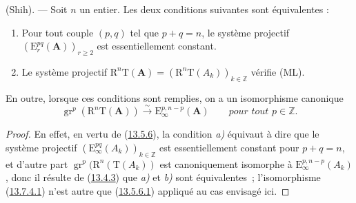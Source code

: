 \begin{proposition}[13.7.4]
\label{0.13.7.4-fr}
(Shih). --- Soit $n$ un entier. Les deux conditions suivantes sont
équivalentes :
\begin{enumerate}
\item[\emph{a)}] Pour tout couple $(p,q)$ tel que $p+q=n$, le
système projectif $(\mathrm E_r^{pq}(\mathbf A))_{r\geq2}$ est
essentiellement constant.
\item[\emph{b)}] Le système projectif
$\mathrm R^n\mathrm T(\mathbf A)=
(\mathrm R^n\mathrm T(A_k))_{k\in\mathbb Z}$ vérifie \textup{(ML)}.
\end{enumerate}
En outre, lorsque ces conditions sont remplies, on a un
isomorphisme canonique
\begin{equation}
\label{0.13.7.4.1-fr}
\tag{13.7.4.1}
\operatorname{gr}^p(\mathrm R^n\mathrm T(\mathbf A))
\xrightarrow{\sim}\mathrm E_\infty^{p,n-p}(\mathbf A)
\qquad\textit{pour tout $p\in\mathbb Z$.}
\end{equation}
\end{proposition}
\begin{proof}
En effet, en vertu de (\hyperref[0.13.5.6-fr]{13.5.6}), la condition
\emph{a)} équivaut à dire que le système projectif
$(\mathrm E_\infty^{pq}(A_k))_{k\in\mathbb Z}$ est essentiellement
constant pour $p+q=n$, et d'autre part
$\operatorname{gr}^p(\mathrm R^n(\mathrm T(A_k))$ est canoniquement
isomorphe à $\mathrm E_\infty^{p,n-p}(A_k)$, donc il résulte de
(\hyperref[0.13.4.3-fr]{13.4.3}) que \emph{a)} et \emph{b)} sont
équivalentes~; l'isomorphisme
(\hyperref[0.13.7.4.1-fr]{13.7.4.1}) n'est autre que
(\hyperref[0.13.5.6.1-fr]{13.5.6.1}) appliqué au cas envisagé ici.
\end{proof}

